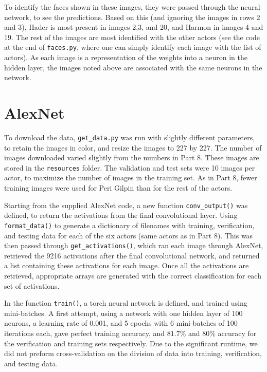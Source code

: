 \documentclass{article}
\begin{document}
   To identify the faces shown in these images, they were passed through the neural network, to see the predictions.
   Based on this (and ignoring the images in rows 2 and 3), Hader is most present in images 2,3, and 20,
   and Harmon in images 4 and 19. The rest of the images are most identified with the other actors (see
   the code at the end of \texttt{faces.py}, where one can simply identify each image with the list of actors).
   As each image is a representation of the weights into a neuron in the hidden layer, the images noted above
   are associated with the same neurons in the network.

   \section{AlexNet}
   To download the data, \texttt{get\_data.py} was run with slightly different parameters, to retain the images
   in color, and resize the images to 227 by 227. The number of images downloaded varied slightly from the numbers
   in Part 8. These images are stored in the \texttt{resources} folder.
   The validation and test sets were 10 images per actor, to maximize the number of images in the training set.
   As in Part 8, fewer training images were used for Peri Gilpin than for the rest of the actors.

   Starting from the supplied AlexNet code, a new function \texttt{conv\_output()} was defined,
   to return the activations from the final convolutional layer. Using \texttt{format\_data()} to generate
   a dictionary of filenames with training, verification, and testing data for each of the six actors (same
   actors as in Part 8). This was then passed through \texttt{get\_activations()}, which ran each image
   through AlexNet, retrieved the 9216 activations after the final convolutional network, and returned a list
   containing these activations for each image. Once all the activations are retrieved, appropriate
   arrays are generated with the correct classification for each set of activations.

   In the function \texttt{train()}, a torch neural network is defined, and trained using mini-batches.
   A first attempt, using a network with one hidden layer of 100 neurons, a learning rate of 0.001, and
   5 epochs with 6 mini-batches of 100 iterations each, gave perfect training accuracy, and $81.7\%$ and
   $80\%$ accuracy for the verification and training sets respectively.
   Due to the significant runtime, we did not preform cross-validation on the division of data into
   training, verification, and testing data.
\end{document}
